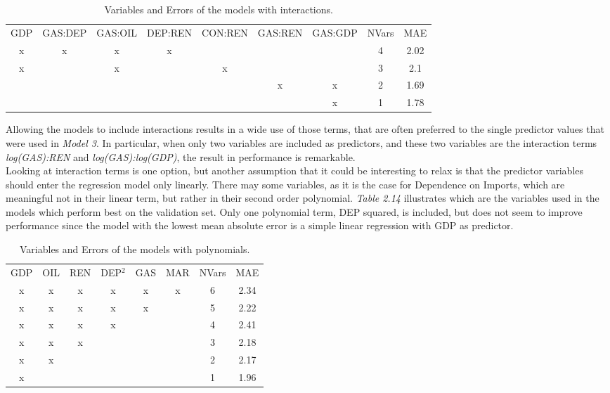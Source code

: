 \documentclass{book}
\begin{document}
\bigskip
\begin{table}[H]
\begin{center}
\begin{tabular}{|c|c|c|c|c|c|c|c|c|}
\hline
\rowcolor{lightgray} \multicolumn{9}{|c|}{Models with Interactions}\\
\hline
GDP&GAS:DEP&GAS:OIL&DEP:REN&CON:REN&GAS:REN&GAS:GDP&NVars&MAE\\
\hline
x&x&x&x&&&&4&2.02\\
x&&x&&x&&&3&2.1\\
&&&&&x&x&2&1.69\\
&&&&&&x&1&1.78\\
\hline
\end{tabular}
\caption{Variables and Errors of the models with interactions.}
\end{center}
\end{table}
\bigskip

Allowing the models to include interactions results in a wide use of those terms, that are often preferred to the single predictor values that were used in \textit{Model 3}. In particular, when only two variables are included as predictors, and these two variables are the interaction terms \textit{log(GAS):REN} and \textit{log(GAS):log(GDP)}, the result in performance is remarkable.\\

Looking at interaction terms is one option, but another assumption that it could be interesting to relax is that the predictor variables should enter the regression model only linearly. There may some variables, as it is the case for Dependence on Imports, which are meaningful not in their linear term, but rather in their second order polynomial. \textit{Table 2.14} illustrates which are the variables used in the models which perform best on the validation set. Only one polynomial term, DEP squared, is included, but does not seem to improve performance since the model with the lowest mean absolute error is a simple linear regression with GDP as predictor.

\bigskip
\begin{table}[H]
\begin{center}
\begin{tabular}{|c|c|c|c|c|c|c|c|}
\hline
\rowcolor{maroon} \multicolumn{8}{|c|}{Models with Polynomials}\\
\hline
GDP&OIL&REN&DEP$^2$&GAS&MAR&NVars&MAE\\
\hline
x&x&x&x&x&x&6&2.34\\
x&x&x&x&x&&5&2.22\\
x&x&x&x&&&4&2.41\\
x&x&x&&&&3&2.18\\
x&x&&&&&2&2.17\\
x&&&&&&1&1.96\\
\hline
\end{tabular}
\caption{Variables and Errors of the models with polynomials.}
\end{center}
\end{table}
\bigskip
\end{document}
